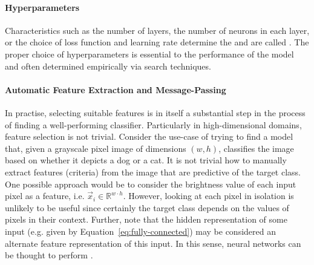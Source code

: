 \documentclass[
	fontsize=10pt, %
	twoside=false, %
	secnumdepth=1, %
  toc=indentunnumbered %
]{kaobook}
\begin{document}
\paragraph{Hyperparameters} Characteristics such as the number of layers, the
number of neurons in each layer, or the choice of loss function and learning rate
determine the  and are called
. The proper choice of hyperparameters is essential to the
performance of the model and often determined empirically via search techniques.

\paragraph{Automatic Feature Extraction and Message-Passing}
In practise, selecting suitable features is in itself a substantial
step in the process of finding a well-performing classifier.
%
Particularly in high-dimensional domains, feature selection is not trivial.
Consider the use-case of trying to find a model that, given a grayscale pixel
image of dimensions $(w, h)$, classifies the image based on whether it depicts a
dog or a cat. It is not trivial how to manually extract features (criteria) from
the image that are predictive of the target class. One possible approach
would be to consider the brightness value of each input pixel as a feature, i.e.
$\vec x_i \in \mathbb{R}^{w \cdot h}$. However, looking at each
pixel in isolation is unlikely to be useful since certainly the target class
depends on the values of pixels in their context.
Further, note that the hidden representation of some input (e.g. given by
Equation~\ref{eq:fully-connected}) may be considered an alternate feature representation
of this input. In this sense, neural networks can be thought to perform
. 
\end{document}

